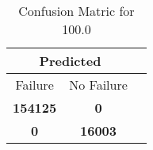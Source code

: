 \begin{table}[] 
\caption{Confusion Matric for 100.0} 
\label{Table: Prediction Accuracy-None100.0RandomForest100EKF-ignoreReflection-Reflection} 
\centering 
\begin{tabular} 
 {@{}ccc@{}} 
\toprule 
\multicolumn{2}{c}{\textbf{Predicted}}
 \\ \midrule 
\multicolumn{1}{|c|}{Failure} & 
\multicolumn{1}{c|}{No Failure}
 \\ \midrule 
\multicolumn{1}{|c|}{\color{green}\textbf{154125}} & 
\multicolumn{1}{c|}{\color{red}\textbf{0}}
 \\ \midrule 
\multicolumn{1}{|c|}{\color{red}\textbf{0}} & 
\multicolumn{1}{c|}{\color{green}\textbf{16003}}
 \\ \bottomrule 
\end{tabular} 
\end{table} 
